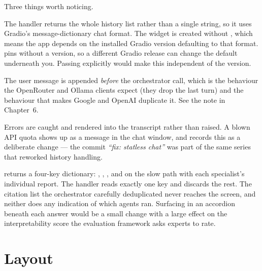 Three things worth noticing.

The handler returns the whole history list rather than a single string, so it uses Gradio's message-dictionary chat format. The  widget is created without , which means the app depends on the installed Gradio version defaulting to that format.  pins  without a version, so a different Gradio release can change the default underneath you. Passing  explicitly would make this independent of the version.

The user message is appended \emph{before} the orchestrator call, which is the behaviour the OpenRouter and Ollama clients expect (they drop the last turn) and the behaviour that makes Google and OpenAI duplicate it. See the note in Chapter~6.

Errors are caught and rendered into the transcript rather than raised. A blown API quota shows up as a message in the chat window, and  records this as a deliberate change --- the commit \emph{``fix: statless chat''} was part of the same series that reworked history handling.

\begin{note}[title={What the UI throws away}]
 returns a four-key dictionary: , , , and on the slow path  with each specialist's individual report. The handler reads exactly one key and discards the rest. The citation list the orchestrator carefully deduplicated never reaches the screen, and neither does any indication of which agents ran. Surfacing  in an accordion beneath each answer would be a small change with a large effect on the interpretability score the evaluation framework asks experts to rate.
\end{note}

\section{Layout}


